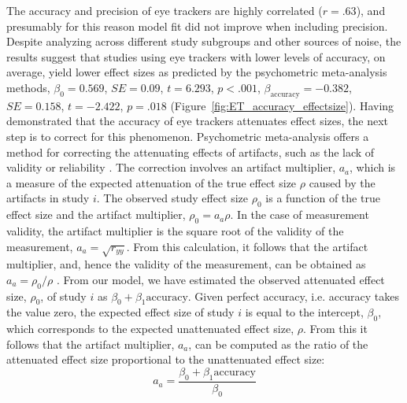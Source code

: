 \documentclass[english,natbib,man,floatsintext]{apa6}
\newcommand{\SE}{\mathit{SE}}
\begin{document}
The accuracy and precision of eye trackers are highly correlated ($r = .63$), and presumably for this reason model fit did not improve when including precision. Despite analyzing across different study subgroups and other sources of noise, the results suggest that studies using eye trackers with lower levels of accuracy, on average, yield lower effect sizes as predicted by the psychometric meta-analysis methods, $\beta_0 = 0.569$, $\SE = 0.09$, $t = 6.293$, $p < .001$, $\beta_{\textrm{accuracy}} = -0.382$, $\SE = 0.158$, $t = -2.422$, $p = .018$ (Figure~\ref{fig:ET_accuracy_effectsize}). Having demonstrated that the accuracy of eye trackers attenuates effect sizes, the next step is to correct for this phenomenon. Psychometric meta-analysis offers a method for correcting the attenuating effects of artifacts, such as the lack of validity or reliability \citep{hunter2004a}. The correction involves an artifact multiplier, $a_a$, which is a measure of the expected attenuation of the true effect size $\rho$ caused by the artifacts in study $i$. The observed study effect size $\rho_0$ is a function of the true effect size and the artifact multiplier, $\rho_0 = a_a \rho$. In the case of measurement validity, the artifact multiplier is the square root of the validity of the measurement, $a_a = \sqrt{r_{yy}}$. From this calculation, it follows that the artifact multiplier, and, hence the validity of the measurement, can be obtained as $a_a = \rho_0 / \rho$ \citep{hunter2004a}. From our model, we have estimated the observed attenuated effect size, $\rho_0$, of study $i$ as $\beta_0 + \beta_1 \textrm{accuracy}$. Given perfect accuracy, i.e. accuracy takes the value zero, the expected effect size of study $i$ is equal to the intercept, $\beta_0$, which corresponds to the expected unattenuated effect size, $\rho$. From this it follows that the artifact multiplier, $a_a$, can be computed as the ratio of the attenuated effect size proportional to the unattenuated effect size:
%
\begin{equation}
\label{eq:artifact_multiplier}
a_a = \frac{\beta_0 + \beta_1 \textrm{accuracy}}{\beta_0}
\end{equation}
\end{document}
